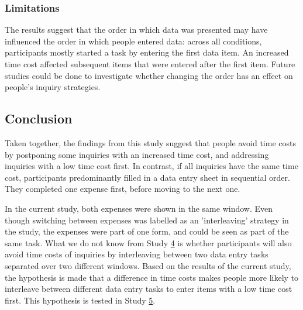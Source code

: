 \subsubsection{Limitations}

The results suggest that the order in which data was presented may have influenced the order in which people entered data: across all conditions, participants mostly started a task by entering the first data item. An increased time cost affected subsequent items that were entered after the first item. Future studies could be done to investigate whether changing the order has an effect on people's inquiry strategies.


\subsection{Conclusion}
Taken together, the findings from this study suggest that people avoid time costs by postponing some inquiries with an increased time cost, and addressing inquiries with a low time cost first. In contrast, if all inquiries have the same time cost, participants predominantly filled in a data entry sheet in sequential order. They completed one expense first, before moving to the next one. 

In the current study, both expenses were shown in the same window. Even though switching between expenses was labelled as an 'interleaving' strategy in the study, the expenses were part of one form, and could be seen as part of the same task. What we do not know from Study \hyperref[st:Study4]{4} is whether participants will also avoid time costs of inquiries by interleaving between two data entry tasks separated over two different windows. Based on the results of the current study, the hypothesis is made that a difference in time costs makes people more likely to interleave between different data entry tasks to enter items with a low time cost first. This hypothesis is tested in Study \hyperref[st:Study5]{5}.

